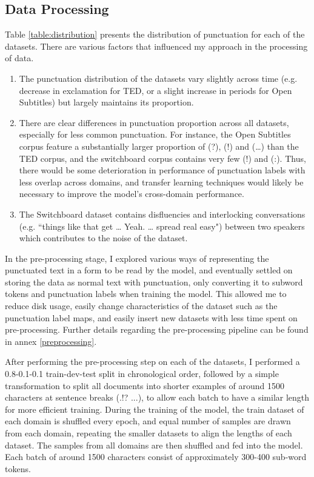 \documentclass[a4paper]{article}
\begin{document}
\begin{multicols}{2}
\subsection{Data Processing}
Table \ref{table:distribution} presents the distribution of punctuation for each of the datasets. There are various factors that influenced my approach in the processing of data. 
\begin{enumerate}
    \item The punctuation distribution of the datasets vary slightly across time (e.g. decrease in exclamation for TED, or a slight increase in periods for Open Subtitles) but largely maintains its proportion. 
    \item There are clear differences in punctuation proportion across all datasets, especially for less common punctuation. For instance, the Open Subtitles corpus feature a substantially larger proportion of (?), (!) and (…) than the TED corpus, and the switchboard corpus contains very few (!) and (:). Thus, there would be some deterioration in performance of punctuation labels with less overlap across domains, and transfer learning techniques would likely be necessary to improve the model's cross-domain performance.
    \item The Switchboard dataset contains disfluencies and interlocking conversations (e.g. ``things like that get … Yeah. … spread real easy") between two speakers which contributes to the noise of the dataset. 
\end{enumerate}

In the pre-processing stage, I explored various ways of representing the punctuated text in a form to be read by the model, and eventually settled on storing the data as normal text with punctuation, only converting it to subword tokens and punctuation labels when training the model. This allowed me to reduce disk usage, easily change characteristics of the dataset such as the punctuation label maps, and easily insert new datasets with less time spent on pre-processing. Further details regarding the pre-processing pipeline can be found in annex \ref{preprocessing}.

After performing the pre-processing step on each of the datasets, I performed a 0.8-0.1-0.1 train-dev-test split in chronological order, followed by a simple transformation to split all documents into shorter examples of around 1500 characters at sentence breaks (.!? ...), to allow each batch to have a similar length for more efficient training. During the training of the model, the train dataset of each domain is shuffled every epoch, and equal number of samples are drawn from each domain, repeating the smaller datasets to align the lengths of each dataset. The samples from all domains are then shuffled and fed into the model. Each batch of around 1500 characters consist of approximately 300-400 sub-word tokens.


\end{multicols}
\end{document}
